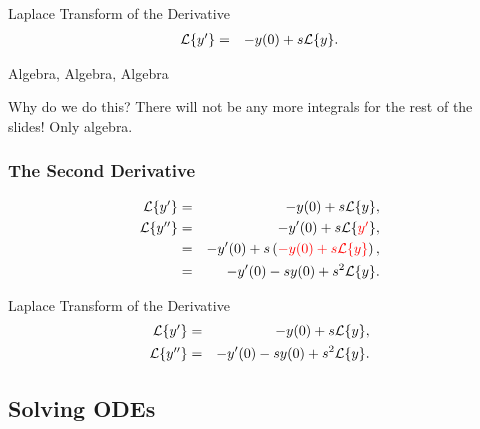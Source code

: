 \begin{frame}
  \begin{block}{Laplace Transform of the Derivative}
    \begin{eqnarray*}
      \laplace{y'} & = & -y(0) + s \laplace{y}.
    \end{eqnarray*}
  \end{block}
\end{frame}

\begin{frame}{Algebra, Algebra, Algebra }

  \vfill

  Why do we do this? There will not be any more integrals for the rest
  of the slides! Only algebra.

  \vfill
  
\end{frame}

\begin{frame}
  \frametitle{The Second Derivative}

  \begin{eqnarray*}
    \laplace{y'} & = & -y(0) + s \laplace{y}, \\
    \laplace{y''} & = & -y'(0) + s \laplace{\redText{y'}}, \\
    & = & -y'(0) + s \lp \redText{-y(0) + s \laplace{y}} \rp, \\
    & = & -y'(0) - s y(0) + s^2 \laplace{y}.
  \end{eqnarray*}

\end{frame}

\begin{frame}
  \begin{block}{Laplace Transform of the Derivative}
    \begin{eqnarray*}
      \laplace{y'} & = & -y(0) + s \laplace{y}, \\
      \laplace{y''} & = & -y'(0) - s y(0) + s^2 \laplace{y}.
    \end{eqnarray*}
  \end{block}
\end{frame}


\subsection{Solving ODEs}

